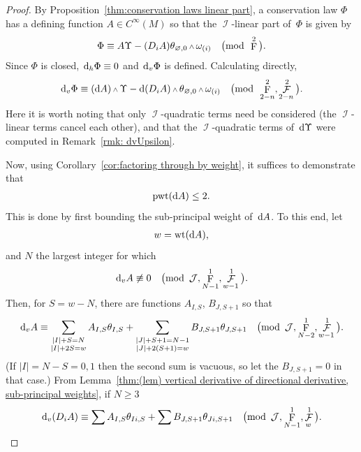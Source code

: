 \documentclass[pdftex]{sigma}
\DeclareMathOperator{\I}{\mathcal{I}}
\renewcommand{\d}{{\rm d}}
\renewcommand{\mod}[1]{\quad\big(\mathrm{mod\enspace} #1\big)}
\newcommand{\w}{{\mathchoice{\,{\scriptstyle\wedge}\,}{{\scriptstyle\wedge}}
 {{\scriptscriptstyle\wedge}}{{\scriptscriptstyle\wedge}}}}
\newcommand{\thetas}[1]{\theta_{#1}}
\newcommand{\thetanot}{\thetas{\varnothing,0}}
\newcommand{\omegas}[1]{\omega_{(#1)}}
\DeclareMathOperator{\pwf}{F}
\DeclareMathOperator{\swf}{\mathcal{F}}
\DeclareMathOperator{\wt}{\mathrm{wt}}
\DeclareMathOperator{\pwt}{\mathrm{pwt}}
\renewcommand{\dh}{\ensuremath{\hspace{1pt} \d_h}}
\newcommand{\dv}{\ensuremath{\hspace{1pt} \d_v}}
\newcommand{\cartTheta}{\mathcal{J}}
\newcommand{\cMinfty}{C^\infty(M)}
\numberwithin{equation}{section}
\begin{document}
\begin{proof}
 By Proposition~\ref{thm:conservation laws linear part}, a conservation law $\Phi$ has a defining function $A \in \cMinfty$ so that the $\I$-linear part of~$\Phi$ is given by
 \begin{gather*}
 \Phi \equiv A\Upsilon - (D_i A)\thetas{\varnothing,0}\w\omegas{i} \mod{\pwf^2} .
 \end{gather*}
 Since $\Phi$ is closed, $\dh\Phi \equiv 0$ and $\dv\Phi$ is defined.
 Calculating directly,
 \begin{gather}\label{eq: dvPhi}
 \dv\Phi \equiv (\d A)\w\Upsilon - \d(D_i A)\w\thetanot\w\omegas{i} \mod{\pwf^2_{2-n},\swf^2_{2-n}} .
 \end{gather}
 Here it is worth noting that only $\I$-quadratic terms need be considered (the $\I$-linear terms cancel each other), and that the $\I$-quadratic terms of~$\d\Upsilon$ were computed in Remark~\ref{rmk: dvUpsilon}.

 Now, using Corollary~\ref{cor:factoring through by weight}, it suffices to demonstrate that
 \begin{gather*}
 \pwt(\d A) \le 2 .
 \end{gather*}
 This is done by first bounding the sub-principal weight of~$\d A$.
 To this end, let
 \begin{gather*}
 w = \wt(\d A) ,
 \end{gather*}
 and $N$ the largest integer for which
 \begin{gather*}
 \dv A \not\equiv 0 \mod{\cartTheta, \pwf^1_{N-1}, \swf^1_{w-1}} .
 \end{gather*}
 Then, for $S = w-N$, there are functions $A_{I,S}$, $B_{J,S+1}$ so that
 \begin{gather*}
 \dv A \equiv \sum_{\substack{|I|+S = N \\ |I|+2S = w}} A_{I,S}\thetas{I,S} + \sum_{\substack{|J|+S+1 = N - 1 \\ |J|+2(S+1) = w}} B_{J,S+1}\thetas{J,S+1} \mod{\cartTheta, \pwf^1_{N-2}, \swf^1_{w-1}} .
 \end{gather*}
 (If $|I| = N-S = 0,1$ then the second sum is vacuous, so let the $B_{J,S+1} = 0$ in that case.)
 From Lemma~\ref{thm:(lem) vertical derivative of directional derivative, sub-principal weights}, if $N \ge 3$
 \begin{gather*}
 \dv(D_i A) \equiv \sum A_{I,S}\thetas{Ii,S} + \sum B_{J,S+1}\thetas{Ji,S+1} \mod{\cartTheta, \pwf^1_{N-1}, \swf^1_{w}} .
 \end{gather*}


\end{proof}
\end{document}
